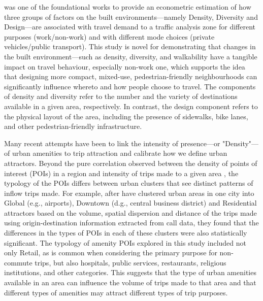 \citet{cerveroTravelDemand3Ds1997} was one of the foundational works to provide an econometric estimation of how three groups of factors on the built environments---namely Density, Diversity and Design---are associated with travel demand to a traffic analysis zone for different purposes (work/non-work) and with different mode choices (private vehicles/public transport). This study is novel for demonstrating that changes in the built environment—such as density, diversity, and walkability have a tangible impact on travel behaviour, especially non-work one, which supports the idea that designing more compact, mixed-use, pedestrian-friendly neighbourhoods can significantly influence whereto and how people choose to travel. The components of density and diversity refer to the number and the variety of destinations available in a given area, respectively. In contrast, the design component refers to the physical layout of the area, including the presence of sidewalks, bike lanes, and other pedestrian-friendly infrastructure.

Many recent attempts have been to link the intensity of presence---or "Density"---of urban amenities to trip attraction and calibrate how we define urban attractors. Beyond the pure correlation observed between the density of points of interest (POIs) in a region and intensity of trips made to a given area \citep{melikovCharacterizingUrbanMobility2021}, the typology of the POIs differs between urban clusters that see distinct patterns of inflow trips made. For example, after \citet{aaqibjavedEstimationTripAttraction2020} have clustered urban areas in one city into Global (e.g., airports), Downtown (d.g., central business district) and Residential attractors based on the volume, spatial dispersion and distance of the trips made using origin-destination information extracted from call data, they found that the differences in the types of POIs in each of these clusters were also statistically significant. The typology of amenity POIs explored in this study included not only Retail, as is common when considering the primary purpose for non-commute trips, but also hospitals, public services, restaurants, religious institutions, and other categories. This suggests that the type of urban amenities available in an area can influence the volume of trips made to that area and that different types of amenities may attract different types of trip purposes.

